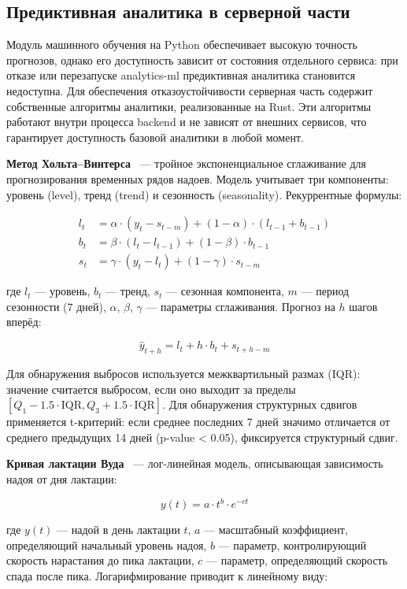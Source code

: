 \subsection{Предиктивная аналитика в серверной части}

Модуль машинного обучения на Python обеспечивает высокую точность прогнозов, однако его доступность зависит от состояния отдельного сервиса: при отказе или перезапуске analytics-ml предиктивная аналитика становится недоступна. Для обеспечения отказоустойчивости серверная часть содержит собственные алгоритмы аналитики, реализованные на Rust. Эти алгоритмы работают внутри процесса backend и не зависят от внешних сервисов, что гарантирует доступность базовой аналитики в любой момент.

\textbf{Метод Хольта--Винтерса}~\cite{HoltWinters} --- тройное экспоненциальное сглаживание для прогнозирования временных рядов надоев. Модель учитывает три компоненты: уровень (level), тренд (trend) и сезонность (seasonality). Рекуррентные формулы:

\begin{align}
l_t &= \alpha \cdot (y_t - s_{t-m}) + (1 - \alpha) \cdot (l_{t-1} + b_{t-1}) \\
b_t &= \beta \cdot (l_t - l_{t-1}) + (1 - \beta) \cdot b_{t-1} \\
s_t &= \gamma \cdot (y_t - l_t) + (1 - \gamma) \cdot s_{t-m}
\end{align}

где $l_t$ --- уровень, $b_t$ --- тренд, $s_t$ --- сезонная компонента, $m$ --- период сезонности (7 дней), $\alpha$, $\beta$, $\gamma$ --- параметры сглаживания. Прогноз на $h$ шагов вперёд:

$$\hat{y}_{t+h} = l_t + h \cdot b_t + s_{t+h-m}$$

Для обнаружения выбросов используется межквартильный размах (IQR): значение считается выбросом, если оно выходит за пределы $[Q_1 - 1.5 \cdot \text{IQR}, Q_3 + 1.5 \cdot \text{IQR}]$. Для обнаружения структурных сдвигов применяется t-критерий: если среднее последних 7 дней значимо отличается от среднего предыдущих 14 дней (p-value < 0.05), фиксируется структурный сдвиг.

\textbf{Кривая лактации Вуда}~\cite{LactationWood} --- лог-линейная модель, описывающая зависимость надоя от дня лактации:

$$y(t) = a \cdot t^b \cdot e^{-ct}$$

где $y(t)$ --- надой в день лактации $t$, $a$ --- масштабный коэффициент, определяющий начальный уровень надоя, $b$ --- параметр, контролирующий скорость нарастания до пика лактации, $c$ --- параметр, определяющий скорость спада после пика. Логарифмирование приводит к линейному виду:

